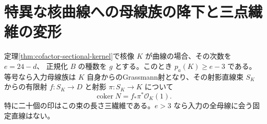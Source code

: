 \section{特異な核曲線への母線族の降下と三点繊維の変形}
\label{sec:cofactor-singular-kernel-descent}
\begin{theorem}\label{thm:cofactor-singular-kernel-descent}
定理\ref{thm:cofactor-sectional-kernel}で核像 $K$ が曲線の場合、その次数を $e=24-d$、
正規化 $B$ の種数を $g$ とする。このとき $p_a(K)\ge e-3$ である。
等号なら入力母線族は $K$ 自身からのGrassmann射となり、その射影直線束 $S_K$ からの有限射
$f:S_K\to D$ と射影 $\pi:S_K\to K$ について
\[
                  \operatorname{coker}N=f_*\pi^*\mathcal O_K(1).
\]
特に二十個の印はこの束の長さ三繊維である。$e>3$ なら入力の全母線に会う固定直線はない。
\end{theorem}
